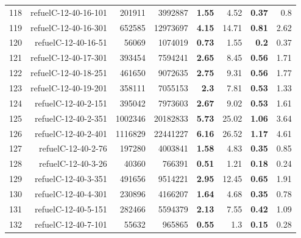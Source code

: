 \begin{longtable}{lrr@{\hskip 12pt}r@{\hskip 12pt}r@{\hskip 12pt}r@{\hskip 12pt}r@{\hskip 12pt}r}
118 & \multirow{1}{*}{refuelC-12-40-16-101} & \multirow{1}{*}{201911} & \multirow{1}{*}{3992887} & \textbf{1.55} & 4.52 & \textbf{0.37} & 0.8 \\
119 & \multirow{1}{*}{refuelC-12-40-16-301} & \multirow{1}{*}{652585} & \multirow{1}{*}{12973697} & \textbf{4.15} & 14.71 & \textbf{0.81} & 2.62 \\
120 & \multirow{1}{*}{refuelC-12-40-16-51} & \multirow{1}{*}{56069} & \multirow{1}{*}{1074019} & \textbf{0.73} & 1.55 & \textbf{0.2} & 0.37 \\
121 & \multirow{1}{*}{refuelC-12-40-17-301} & \multirow{1}{*}{393454} & \multirow{1}{*}{7594241} & \textbf{2.65} & 8.45 & \textbf{0.56} & 1.71 \\
122 & \multirow{1}{*}{refuelC-12-40-18-251} & \multirow{1}{*}{461650} & \multirow{1}{*}{9072635} & \textbf{2.75} & 9.31 & \textbf{0.56} & 1.77 \\
123 & \multirow{1}{*}{refuelC-12-40-19-201} & \multirow{1}{*}{358111} & \multirow{1}{*}{7055153} & \textbf{2.3} & 7.81 & \textbf{0.53} & 1.33 \\
124 & \multirow{1}{*}{refuelC-12-40-2-151} & \multirow{1}{*}{395042} & \multirow{1}{*}{7973603} & \textbf{2.67} & 9.02 & \textbf{0.53} & 1.61 \\
125 & \multirow{1}{*}{refuelC-12-40-2-351} & \multirow{1}{*}{1002346} & \multirow{1}{*}{20182833} & \textbf{5.73} & 25.02 & \textbf{1.06} & 3.64 \\
126 & \multirow{1}{*}{refuelC-12-40-2-401} & \multirow{1}{*}{1116829} & \multirow{1}{*}{22441227} & \textbf{6.16} & 26.52 & \textbf{1.17} & 4.61 \\
127 & \multirow{1}{*}{refuelC-12-40-2-76} & \multirow{1}{*}{197280} & \multirow{1}{*}{4003841} & \textbf{1.58} & 4.83 & \textbf{0.35} & 0.85 \\
128 & \multirow{1}{*}{refuelC-12-40-3-26} & \multirow{1}{*}{40360} & \multirow{1}{*}{766391} & \textbf{0.51} & 1.21 & \textbf{0.18} & 0.24 \\
129 & \multirow{1}{*}{refuelC-12-40-3-351} & \multirow{1}{*}{491656} & \multirow{1}{*}{9514221} & \textbf{2.95} & 12.45 & \textbf{0.65} & 1.91 \\
130 & \multirow{1}{*}{refuelC-12-40-4-301} & \multirow{1}{*}{230896} & \multirow{1}{*}{4166207} & \textbf{1.64} & 4.68 & \textbf{0.35} & 0.78 \\
131 & \multirow{1}{*}{refuelC-12-40-5-151} & \multirow{1}{*}{282466} & \multirow{1}{*}{5594379} & \textbf{2.13} & 7.55 & \textbf{0.42} & 1.09 \\
132 & \multirow{1}{*}{refuelC-12-40-7-101} & \multirow{1}{*}{55632} & \multirow{1}{*}{965865} & \textbf{0.55} & 1.3 & \textbf{0.15} & 0.28 \\

\end{longtable}
